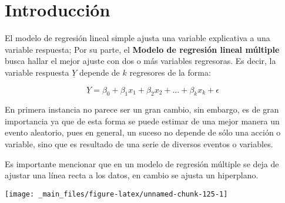 \documentclass[
  a4paper,
  oneside,
  openany]{book}
\newenvironment{Shaded}{\begin{snugshade}}{\end{snugshade}}
\newcommand{\AttributeTok}[1]{\textcolor[rgb]{0.77,0.63,0.00}{#1}}
\newcommand{\DecValTok}[1]{\textcolor[rgb]{0.00,0.00,0.81}{#1}}
\newcommand{\FunctionTok}[1]{\textcolor[rgb]{0.00,0.00,0.00}{#1}}
\newcommand{\NormalTok}[1]{#1}
\newcommand{\OtherTok}[1]{\textcolor[rgb]{0.56,0.35,0.01}{#1}}
\newcommand{\SpecialCharTok}[1]{\textcolor[rgb]{0.00,0.00,0.00}{#1}}
\newcommand{\StringTok}[1]{\textcolor[rgb]{0.31,0.60,0.02}{#1}}
\begin{document}
\hypertarget{introducciuxf3n-6}{%
\section{Introducción}\label{introducciuxf3n-6}}

El modelo de regresión lineal simple ajusta una variable explicativa a una variable respuesta; Por su parte, el \textbf{Modelo de regresión lineal múltiple} busca hallar el mejor ajuste con dos o más variables regresoras. Es decir, la variable respuesta \(\underline{Y}\) depende de \(k\) regresores de la forma:

\[
\underline{Y}=\beta_{0}+\beta_{1}x_{1}+\beta_{2}x_{2}+ \ldots +\beta_{k}x_{k}+\epsilon
\]

En primera instancia no parece ser un gran cambio, sin embargo, es de gran importancia ya que de esta forma se puede estimar de una mejor manera un evento aleatorio, pues en general, un suceso no depende de sólo una acción o variable, sino que es resultado de una serie de diversos eventos o variables.

Es importante mencionar que en un modelo de regresión múltiple se deja de ajustar una línea recta a los datos, en cambio se ajusta un hiperplano.

\begin{Shaded}
\end{Shaded}

\begin{center}\texttt{[image: \_main\_files/figure-latex/unnamed-chunk-125-1]} \end{center}
\end{document}
